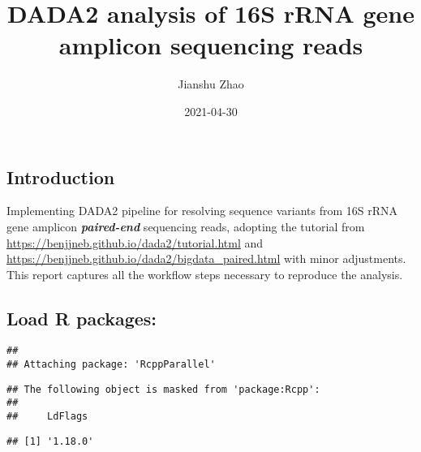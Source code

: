 \documentclass[
]{article}
\title{DADA2 analysis of 16S rRNA gene amplicon sequencing reads}
\author{Jianshu Zhao}
\date{2021-04-30}
\newenvironment{Shaded}{\begin{snugshade}}{\end{snugshade}}
\newcommand{\AttributeTok}[1]{\textcolor[rgb]{0.77,0.63,0.00}{#1}}
\newcommand{\ConstantTok}[1]{\textcolor[rgb]{0.00,0.00,0.00}{#1}}
\newcommand{\DecValTok}[1]{\textcolor[rgb]{0.00,0.00,0.81}{#1}}
\newcommand{\FunctionTok}[1]{\textcolor[rgb]{0.00,0.00,0.00}{#1}}
\newcommand{\NormalTok}[1]{#1}
\newcommand{\SpecialCharTok}[1]{\textcolor[rgb]{0.00,0.00,0.00}{#1}}
\begin{document}
\maketitle

\begin{Shaded}
\end{Shaded}

\hypertarget{introduction}{%
\subsection{Introduction}\label{introduction}}

Implementing DADA2 pipeline for resolving sequence variants from 16S
rRNA gene amplicon \textbf{\emph{paired-end}} sequencing reads, adopting
the tutorial from \url{https://benjjneb.github.io/dada2/tutorial.html}
and \url{https://benjjneb.github.io/dada2/bigdata_paired.html} with
minor adjustments. This report captures all the workflow steps necessary
to reproduce the analysis.

\hypertarget{load-r-packages}{%
\subsection{Load R packages:}\label{load-r-packages}}

\begin{verbatim}
## 
## Attaching package: 'RcppParallel'
\end{verbatim}

\begin{verbatim}
## The following object is masked from 'package:Rcpp':
## 
##     LdFlags
\end{verbatim}

\begin{verbatim}
## [1] '1.18.0'
\end{verbatim}
\end{document}

